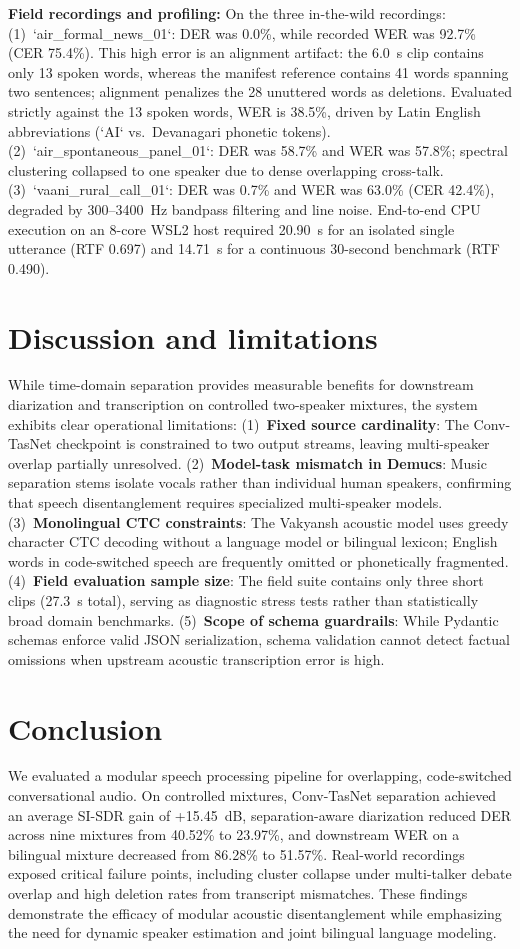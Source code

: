 \documentclass[11pt,a4paper,twocolumn]{article}
\begin{document}
\noindent\textbf{Field recordings and profiling:} On the three in-the-wild recordings: (1)~`air\_formal\_news\_01`: DER was 0.0\%, while recorded WER was 92.7\% (CER 75.4\%). This high error is an alignment artifact: the 6.0~s clip contains only 13 spoken words, whereas the manifest reference contains 41 words spanning two sentences; alignment penalizes the 28 unuttered words as deletions. Evaluated strictly against the 13 spoken words, WER is 38.5\%, driven by Latin English abbreviations (`AI` vs.\ Devanagari phonetic tokens). (2)~`air\_spontaneous\_panel\_01`: DER was 58.7\% and WER was 57.8\%; spectral clustering collapsed to one speaker due to dense overlapping cross-talk. (3)~`vaani\_rural\_call\_01`: DER was 0.7\% and WER was 63.0\% (CER 42.4\%), degraded by 300--3400~Hz bandpass filtering and line noise. End-to-end CPU execution on an 8-core WSL2 host required 20.90~s for an isolated single utterance (RTF 0.697) and 14.71~s for a continuous 30-second benchmark (RTF 0.490).

\section{Discussion and limitations}
While time-domain separation provides measurable benefits for downstream diarization and transcription on controlled two-speaker mixtures, the system exhibits clear operational limitations: (1)~\textbf{Fixed source cardinality}: The Conv-TasNet checkpoint is constrained to two output streams, leaving multi-speaker overlap partially unresolved. (2)~\textbf{Model-task mismatch in Demucs}: Music separation stems isolate vocals rather than individual human speakers, confirming that speech disentanglement requires specialized multi-speaker models. (3)~\textbf{Monolingual CTC constraints}: The Vakyansh acoustic model uses greedy character CTC decoding without a language model or bilingual lexicon; English words in code-switched speech are frequently omitted or phonetically fragmented. (4)~\textbf{Field evaluation sample size}: The field suite contains only three short clips (27.3~s total), serving as diagnostic stress tests rather than statistically broad domain benchmarks. (5)~\textbf{Scope of schema guardrails}: While Pydantic schemas enforce valid JSON serialization, schema validation cannot detect factual omissions when upstream acoustic transcription error is high.

\section{Conclusion}
We evaluated a modular speech processing pipeline for overlapping, code-switched conversational audio. On controlled mixtures, Conv-TasNet separation achieved an average SI-SDR gain of +15.45~dB, separation-aware diarization reduced DER across nine mixtures from 40.52\% to 23.97\%, and downstream WER on a bilingual mixture decreased from 86.28\% to 51.57\%. Real-world recordings exposed critical failure points, including cluster collapse under multi-talker debate overlap and high deletion rates from transcript mismatches. These findings demonstrate the efficacy of modular acoustic disentanglement while emphasizing the need for dynamic speaker estimation and joint bilingual language modeling.
\end{document}
